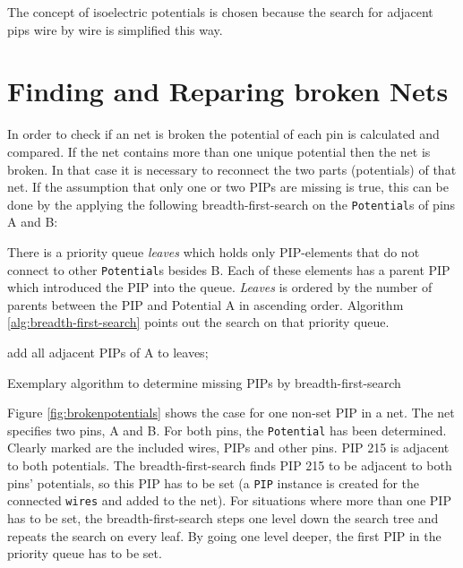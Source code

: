 The concept of isoelectric potentials is chosen because the search for adjacent pips wire by wire is simplified this way.


\newpage
\section{Finding and Reparing broken Nets}
\label{sec:findingandrepairingbrokennets}

In order to check if an net is broken the potential of each pin is calculated and compared. If the net contains more than one unique potential then the net is broken.
In that case it is necessary to reconnect the two parts (potentials) of that net. If the assumption that only one or two PIPs are missing is true, this can be done by the applying the following breadth-first-search on the \texttt{Potential}s of pins A and B:

There is a priority queue \textit{leaves} which holds only PIP-elements that do not connect to other \texttt{Potential}s besides B. 
Each of these elements has a parent PIP which introduced the PIP into the queue. \textit{Leaves} is ordered by the number of parents between the PIP and Potential A in ascending order. Algorithm \ref{alg:breadth-first-search} points out the search on that priority queue.

\begin{algorithm}[h]
	add all adjacent PIPs of A to leaves;\\
 \caption{Exemplary algorithm to determine missing PIPs by breadth-first-search}
 \label{alg:breadth-first-search}
\end{algorithm}


Figure \ref{fig:brokenpotentials} shows the case for one non-set PIP in a net. The net specifies two pins, A and B. For both pins, the \texttt{Potential} has been determined. Clearly marked are the included wires, PIPs and other pins. PIP 215 is adjacent to both potentials. The breadth-first-search finds PIP 215 to be adjacent to both pins' potentials, so this PIP has to be set (a \texttt{PIP} instance is created for the connected \texttt{wires} and added to the net). For situations where more than one PIP has to be set, the breadth-first-search steps one level down the search tree and repeats the search on every leaf. By going one level deeper, the first PIP in the priority queue has to be set.


